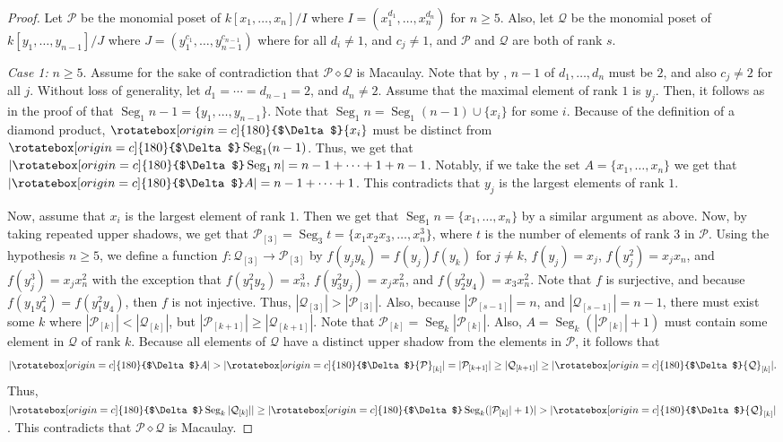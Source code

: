 \documentclass[11pt, reqno]{amsart}
\newcommand{\Q}{{\mathcal Q}}
\renewcommand{\P}{{\mathcal P}}
\newcommand{\uSdw}{\rotatebox[origin=c]{180}{$\Delta$}}
\def\Seg{\operatorname{Seg}}
\theoremstyle{plain} %
\theoremstyle{definition}
\theoremstyle{remark}
\numberwithin{equation}{section}  %
\begin{document}
\begin{proof}
Let $\P$ be the monomial poset of $k[x_1,\dots,x_n]/I$ where $I = (x_1^{d_1},\dots,x_n^{d_n})$ for $n \geq 5$. Also, let $\Q$ be the monomial poset of $k[y_1,\dots,y_{n-1}]/J$ where $J = (y_1^{c_1},\dots,y_{n-1}^{c_{n-1}})$ where for all $d_i \neq 1$, and $c_j \neq 1$, and $\P$ and $\Q$ are both of rank $s$. 
    
\emph{Case 1:} $n \geq 5$. 
Assume for the sake of contradiction that $\P \diamond \Q$ is Macaulay. Note that by , $n-1$ of $d_1,\dots,d_n$ must be $2$, and also $c_j \neq 2$ for all $j$. Without loss of generality, let $d_1=\cdots=d_{n-1} = 2$, and $d_n \neq 2$. Assume that the maximal element of rank $1$ is $y_j$. Then, it follows as in the proof of  that $\Seg_1 n-1 = \{y_1,\dots,y_{n-1}\}$. Note that $\Seg_1 n = \Seg_1 (n-1) \cup \{x_i\}$ for some $i$. Because of the definition of a diamond product, $\uSdw \{x_i\}$ must be distinct from $\uSdw \Seg_1 (n-1)$. Thus, we get that $|\uSdw \Seg_1 n| = n - 1 + \dots + 1 + n - 1$. Notably, if we take the set $A = \{x_1,\dots,x_n\}$ we get that $|\uSdw A| = n-1 + \dots + 1$. This contradicts that $y_j$ is the largest elements of rank $1$.
    
Now, assume that $x_i$ is the largest element of rank $1$.  Then we get that $\Seg_1 n = \{x_1, \dots, x_n\}$ by a similar argument as above. Now, by taking repeated upper shadows, we get that $\P_{[3]} = \Seg_3 t = \{x_1x_2x_3,\dots,x_n^3\}$, where $t$ is the number of elements of rank $3$ in $\P$. 
Using the hypothesis $n\geq 5$, we define a function $f: \Q_{[3]} \to \P_{[3]}$ by $f(y_jy_k) = f(y_j)f(y_k)$ for $j \neq k$, $f(y_j) = x_j$, $f(y_j^2) = x_jx_n$, and $f(y_j^3) = x_jx_n^2$ with the exception that $f(y_1^2y_2) = x_n^3$, $f(y_3^2y_j) = x_jx^2_n$, and $f(y_2^2y_4) = x_3x_n^2$. Note that $f$ is surjective, and because $f(y_1y_4^2) = f(y_1^2y_4)$, then $f$ is not injective. Thus, 
$|\Q_{[3]}| > |\P_{[3]}|$. Also, because $|\P_{[s-1]}| = n$, and $|\Q_{[s-1]}| = n-1$, there must exist some $k$ where $|\P_{[k]}| < |\Q_{[k]}|$, but $|\P_{[k+1]}| \geq |\Q_{[k+1]}|$. Note that $\P_{[k]} = \Seg_k |\P_{[k]}|$. Also,  $A= \Seg_k (|\P_{[k]}| + 1)$ must contain some element in $\Q$ of rank $k$. Because all elements of $\Q$ have a distinct upper shadow from the elements in $\P$, it follows that 
\begin{equation*}
|\uSdw A| > |\uSdw \P_{[k]}| =|\P_{[k+1]}|\geq  |\Q_{[k+1]}| \geq |\uSdw \Q_{[k]}|.
\end{equation*}
Thus, $|\uSdw \Seg_k |\Q_{[k]}|| \geq |\uSdw \Seg_k (|\P_{[k]}| + 1)| > |\uSdw \Q_{[k]}|$. This contradicts that $\P \diamond \Q$ is Macaulay.
      

\end{proof}
\end{document}

